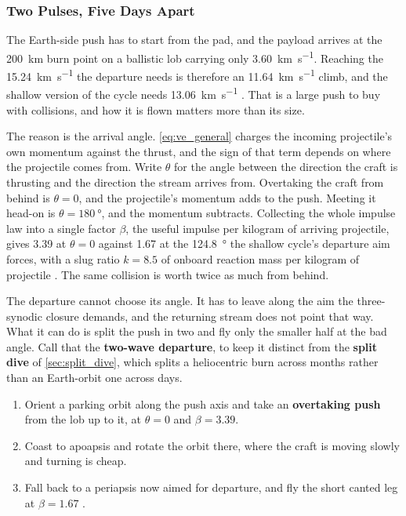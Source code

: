 \documentclass{article}
\begin{document}
\subsubsection{Two Pulses, Five Days Apart}\label{sec:split_push}
The Earth-side push has to start from the pad, and the payload arrives at the \SI{200}{\kilo\meter} burn point on a ballistic lob carrying only \SI{3.60}{\kilo\meter\per\second}. Reaching the \SI{15.24}{\kilo\meter\per\second} the departure needs is therefore an \SI{11.64}{\kilo\meter\per\second} climb, and the shallow version of the cycle needs \SI{13.06}{\kilo\meter\per\second} \cite{Katz_aim_is_all_you_need_2025}. That is a large push to buy with collisions, and how it is flown matters more than its size.

The reason is the arrival angle. \autoref{eq:ve_general} charges the incoming projectile's own momentum against the thrust, and the sign of that term depends on where the projectile comes from. Write $\theta$ for the angle between the direction the craft is thrusting and the direction the stream arrives from. Overtaking the craft from behind is $\theta = 0$, and the projectile's momentum adds to the push. Meeting it head-on is $\theta = \SI{180}{\degree}$, and the momentum subtracts. Collecting the whole impulse law into a single factor $\beta$, the useful impulse per kilogram of arriving projectile, gives \num{3.39} at $\theta = 0$ against \num{1.67} at the \SI{124.8}{\degree} the shallow cycle's departure aim forces, with a slug ratio $k = 8.5$ of onboard reaction mass per kilogram of projectile \cite{Katz_aim_is_all_you_need_2025}. The same collision is worth twice as much from behind.

The departure cannot choose its angle. It has to leave along the aim the three-synodic closure demands, and the returning stream does not point that way. What it can do is split the push in two and fly only the smaller half at the bad angle. Call that the \textbf{two-wave departure}, to keep it distinct from the \textbf{split dive} of \autoref{sec:split_dive}, which splits a heliocentric burn across months rather than an Earth-orbit one across days.

\begin{enumerate}
    \item Orient a parking orbit along the push axis and take an \textbf{overtaking push} from the lob up to it, at $\theta = 0$ and $\beta = 3.39$.
    \item Coast to apoapsis and rotate the orbit there, where the craft is moving slowly and turning is cheap.
    \item Fall back to a periapsis now aimed for departure, and fly the short canted leg at $\beta = 1.67$ \cite{Katz_aim_is_all_you_need_2025}.
\end{enumerate}
\end{document}
